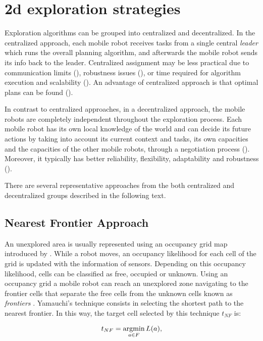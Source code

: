 \section{2d exploration strategies}

Exploration algorithms can be grouped into centralized and decentralized. In the  centralized approach, each mobile robot receives tasks from a single central \emph{leader} which runs the overall planning algorithm, and afterwards the mobile robot sends its info back to the leader. Centralized assignment may be less practical due to communication limits (\cite{Dias2000}), robustness issues (\cite{Dias2006}), or time required for algorithm execution and scalability (\cite{Julia2012}). An advantage of centralized approach is that optimal plans can be found (\cite{Yan2011}). 

In contrast to centralized approaches, in a decentralized approach, the mobile robots are completely independent throughout the exploration process. Each mobile robot has its own local knowledge of the world and can decide its future actions by taking into account its current context and tasks, its own capacities and the capacities of the other mobile robots, through a negotiation process (\cite{Yan2013}). Moreover, it typically has better reliability, flexibility, adaptability and robustness (\cite{Zlot2002}). 
 
There are several representative approaches from the both centralized and decentralized groups described in the following text. 



\subsection{Nearest Frontier Approach} 

An unexplored area is usually represented using an occupancy grid map introduced by \cite{Moravec}. While a robot moves, an occupancy likelihood for each cell of the grid is updated with the information of sensors. Depending on this occupancy likelihood, cells can be classified as free, occupied or unknown. Using an occupancy grid a mobile robot can reach an unexplored zone navigating to the frontier cells that separate the free cells from the unknown cells known as \textit{frontiers} \cite{Yamauchi1997}. Yamauchi's technique consists in selecting the shortest path to the nearest frontier. In this way, the target cell selected by this technique $t_{NF}$ is:

\begin{equation}
t_{NF} = \operatorname*{argmin}_{a \in F} L(a), 
\label{equation:t-nf}
\end{equation}

